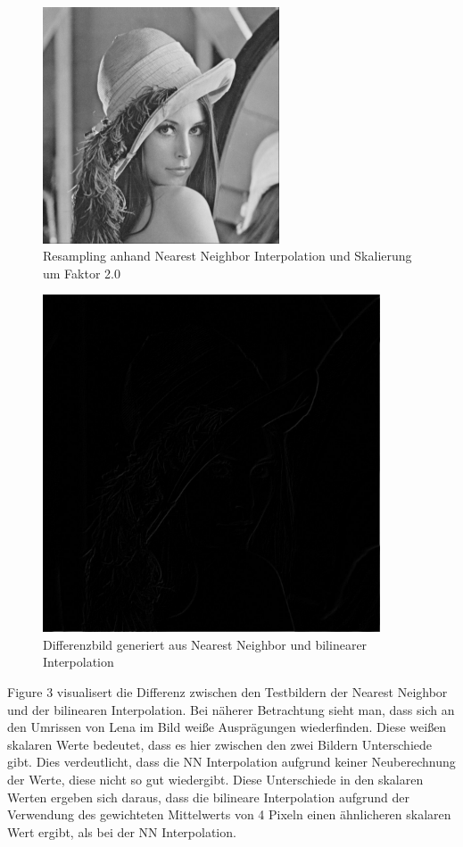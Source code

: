 \documentclass[12pt,german]{article}
\begin{document}
\begin{figure}[H]
	\centering
	\includegraphics[width=7cm]{images/bilineare-interpolation-final/nn-scaled-2.jpeg}
	\caption{Resampling anhand Nearest Neighbor Interpolation und Skalierung um Faktor 2.0}
	\label{fig:resultResamplingNNInterpolation-2.0}
\end{figure}

\begin{figure}[H]
	\centering
	\includegraphics[width=10cm]{images/bilineare-interpolation-final/differenz-bilinear-2.jpg}
	\caption{Differenzbild generiert aus Nearest Neighbor und bilinearer Interpolation}
	\label{fig:resultResamplingDifference}
\end{figure}

Figure 3 visualisert die Differenz zwischen den Testbildern der Nearest Neighbor und der bilinearen Interpolation. Bei näherer Betrachtung sieht man, dass sich an den Umrissen von Lena im Bild weiße Ausprägungen wiederfinden. Diese weißen skalaren Werte bedeutet, dass es hier zwischen den zwei Bildern Unterschiede gibt. Dies verdeutlicht, dass die NN Interpolation aufgrund keiner Neuberechnung der Werte, diese nicht so gut wiedergibt. Diese Unterschiede in den skalaren Werten ergeben sich daraus, dass die bilineare Interpolation aufgrund der Verwendung des gewichteten Mittelwerts von 4 Pixeln einen ähnlicheren skalaren Wert ergibt, als bei der NN Interpolation.
\end{document}
